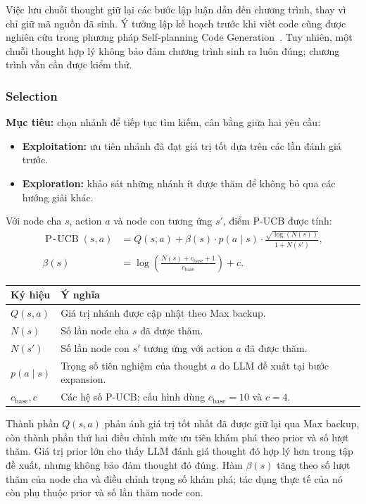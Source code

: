 Việc lưu chuỗi thought giữ lại các bước lập luận dẫn đến chương trình, thay vì chỉ giữ mã nguồn đã sinh. Ý tưởng lập kế hoạch trước khi viết code cũng được nghiên cứu trong phương pháp Self-planning Code Generation~\cite{jiang2023selfplanning}. Tuy nhiên, một chuỗi thought hợp lý không bảo đảm chương trình sinh ra luôn đúng; chương trình vẫn cần được kiểm thử.

\subsubsection{Selection}
\textbf{Mục tiêu:} chọn nhánh để tiếp tục tìm kiếm, cân bằng giữa hai yêu cầu:
\begin{itemize}
  \item \textbf{Exploitation:} ưu tiên nhánh đã đạt giá trị tốt dựa trên các lần đánh giá trước.
  \item \textbf{Exploration:} khảo sát những nhánh ít được thăm để không bỏ qua các hướng giải khác.
\end{itemize}

Với node cha $s$, action $a$ và node con tương ứng $s'$, điểm P-UCB được tính:
\begin{align}
  \operatorname{P\!-\!UCB}(s,a)
  &= Q(s,a)+\beta(s)\cdot p(a\mid s)\cdot
     \frac{\sqrt{\log(N(s))}}{1+N(s')},\\
  \beta(s)
  &= \log\left(\frac{N(s)+c_{\mathrm{base}}+1}{c_{\mathrm{base}}}\right)+c.
\end{align}
\begin{center}
\renewcommand{\arraystretch}{1.35}
\begin{tabularx}{\linewidth}{|>{\centering\arraybackslash}p{3cm}|X|}
  \hline
  Ký hiệu & Ý nghĩa \\
  \hline
  $Q(s,a)$ & Giá trị nhánh được cập nhật theo Max backup. \\
  \hline
  $N(s)$ & Số lần node cha $s$ đã được thăm. \\
  \hline
  $N(s')$ & Số lần node con $s'$ tương ứng với action $a$ đã được thăm. \\
  \hline
  $p(a\mid s)$ & Trọng số tiên nghiệm của thought $a$ do LLM đề xuất tại bước expansion. \\
  \hline
  $c_{\mathrm{base}},c$ & Các hệ số P-UCB; cấu hình dùng $c_{\mathrm{base}}=10$ và $c=4$. \\
  \hline
\end{tabularx}
\end{center}

Thành phần $Q(s,a)$ phản ánh giá trị tốt nhất đã được giữ lại qua Max backup, còn thành phần thứ hai điều chỉnh mức ưu tiên khám phá theo prior và số lượt thăm. Giá trị prior lớn cho thấy LLM đánh giá thought đó hợp lý hơn trong tập đề xuất, nhưng không bảo đảm thought đó đúng. Hàm $\beta(s)$ tăng theo số lượt thăm của node cha và điều chỉnh trọng số khám phá; tác dụng thực tế của nó còn phụ thuộc prior và số lần thăm node con.

